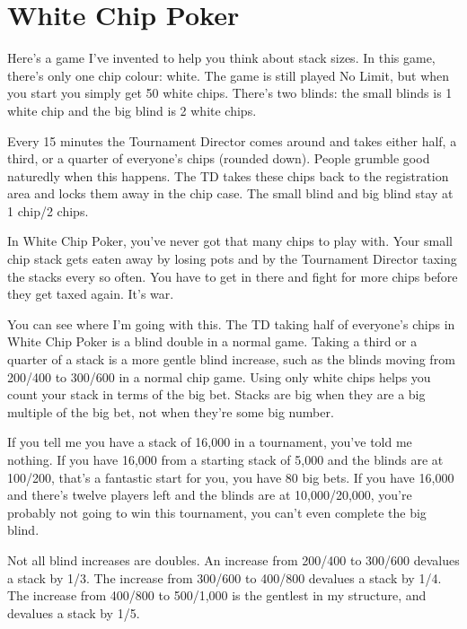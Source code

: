 \section{White Chip Poker}

Here's a game I've invented to help you think about stack sizes.
In this game, there's only one chip colour: white. The game is
still played No Limit, but when you start you simply get 50 white chips.
There's two blinds: the small blinds is 1 white chip and the
big blind is 2 white chips.

Every 15 minutes the Tournament Director comes
around and takes either half, a third, or a quarter of everyone's
chips (rounded down). People grumble good naturedly when this happens.
The TD takes these chips back to the registration area and locks them away
in the chip case. The small blind and big blind stay at 1 chip/2 chips.

In White Chip Poker, you've never got that many chips to play with.
Your small chip stack gets eaten away by losing pots and by the
Tournament Director taxing the stacks every so often. You have to
get in there and fight for more chips before they get taxed again.
It's war.

You can see where I'm going with this. The TD taking half of
everyone's chips in White Chip Poker is a blind double in a normal game.
Taking a third or a quarter of a stack is a more gentle blind increase,
such as the blinds moving from 200/400 to 300/600 in a normal chip game.
Using only white chips helps you count your stack in terms of the big bet.
Stacks are big when they are a big multiple of the big bet, not when
they're some big number.

If you tell me you have a stack of 16,000 in a tournament, you've
told me nothing. If you have 16,000 from a starting stack of 5,000
and the blinds are at 100/200, that's a fantastic start for you, you
have 80 big bets. If you have 16,000 and there's twelve
players left and the blinds are at 10,000/20,000, you're probably
not going to win this tournament, you can't even complete the big blind.

Not all blind increases are doubles. An increase from 200/400 to 300/600
devalues a stack by 1/3. The increase from 300/600 to 400/800 devalues
a stack by 1/4. The increase from 400/800 to 500/1,000 is the gentlest
in my structure, and devalues a stack by 1/5.



